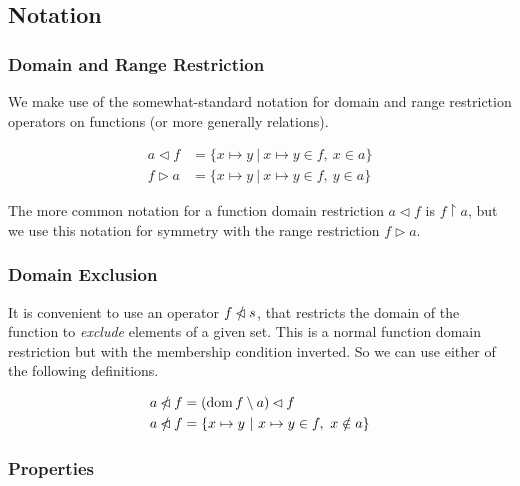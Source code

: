 \documentclass{article}
\DeclareMathOperator{\dom}{dom}
\newcommand{\restrictdom}{\lhd}
\newcommand{\subtractdom}{\mathbin{\slashed{\restrictdom}}}
\newcommand{\restrictrange}{\rhd}
\begin{document}
\subsection{Notation}

\subsubsection{Domain and Range Restriction}

We make use of the somewhat-standard notation for domain and range restriction
operators on functions (or more generally relations).

\begin{equation*}
\begin{split}
a \restrictdom  f  & = \{ x \mapsto y ~|~ x \mapsto y \in f, ~ x \in a \} \\
f \restrictrange a  & = \{ x \mapsto y ~|~ x \mapsto y \in f, ~ y \in a \}
\end{split}
\end{equation*}

The more common notation for a function domain restriction $a \restrictdom f$
is $f \restriction a$, but we use this notation for symmetry with the range
restriction $f \restrictrange a$.

\subsubsection{Domain Exclusion}

It is convenient to use an operator $f \subtractdom s$, that restricts the
domain of the function to \emph{exclude} elements of a given set. This is a
normal function domain restriction but with the membership condition inverted.
So we can use either of the following definitions.

\begin{equation*}
\begin{split}
a \subtractdom f  & = ( \dom f \setminus a ) \restrictdom f \\
a \subtractdom f  & = \{ x \mapsto y ~|~ x \mapsto y \in f, ~ x \notin a \}
\end{split}
\end{equation*}

\subsubsection{Properties}
\end{document}
